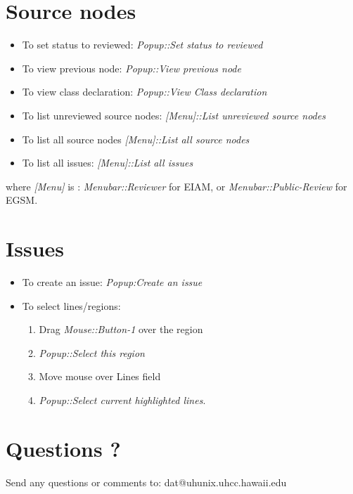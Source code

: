 \section* {Source nodes}
\begin{itemize}
\item To set status to reviewed: {\it Popup::Set status to reviewed}
\item To view previous node: {\it Popup::View previous node}
\item To view class declaration: {\it Popup::View Class declaration}
\item To list unreviewed source nodes: {\it [Menu]::List unreviewed source nodes} 
\item To list all source nodes {\it [Menu]::List all source nodes}
\item To list all issues: {\it [Menu]::List all issues}
\end{itemize}

where {\it [Menu]} is : {\it Menubar::Reviewer} for EIAM, or
{\it Menubar::Public-Review} for EGSM.


\section* {Issues}
\begin{itemize}
\item To create an issue: {\it Popup:Create an issue}
\item To select lines/regions: 
   \begin{enumerate}
     \item Drag {\it Mouse::Button-1} over the region
     \item {\it Popup::Select this region}
     \item Move mouse over Lines field 
     \item {\it Popup::Select current highlighted lines}.
   \end{enumerate}

\end{itemize}

\section* {Questions ?}
Send any questions or comments to: dat@uhunix.uhcc.hawaii.edu
  



